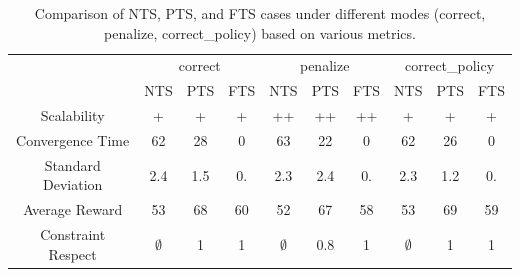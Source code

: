 \documentclass[sigconf,anonymous]{aamas}
\begin{document}
\begin{table}[h!]
  \centering
  \caption{Comparison of NTS, PTS, and FTS cases under different modes (correct, penalize, correct\_policy) based on various metrics. \vspace{0.2cm} }\label{tab:results}
  \setlength{\tabcolsep}{5pt}
  \begin{tabular}{cccccccccc}
    \cline{2-10}
                       & \multicolumn{3}{c}{correct} & \multicolumn{3}{c}{penalize} & \multicolumn{3}{c}{correct\_policy}                                                     \\
    \cline{2-10}
                       & NTS                         & PTS                          & FTS                                 & NTS         & PTS & FTS & NTS         & PTS & FTS \\
    \hline
    Scalability        & +                           & +                            & +                                   & ++          & ++  & ++  & +           & +   & +   \\
    Convergence Time   & 62                          & 28                           & 0                                   & 63          & 22  & 0   & 62          & 26  & 0   \\
    Standard Deviation & 2.4                         & 1.5                          & 0.                                  & 2.3         & 2.4 & 0.  & 2.3         & 1.2 & 0.  \\
    Average Reward     & 53                          & 68                           & 60                                  & 52          & 67  & 58  & 53          & 69  & 59  \\
    Constraint Respect & $\emptyset$                 & 1                            & 1                                   & $\emptyset$ & 0.8 & 1   & $\emptyset$ & 1   & 1   \\
  \end{tabular}
\end{table}
%
%
%
%
%
\end{document}
